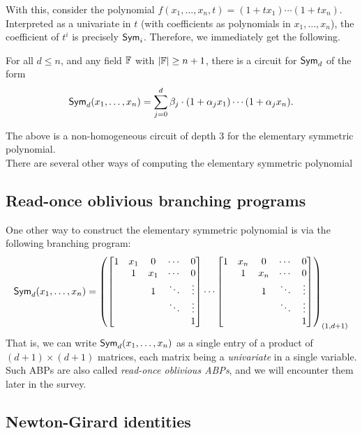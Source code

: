 With this, consider the polynomial $f(x_1,\ldots, x_n, t) = (1 + tx_1) \cdots (1 + tx_n)$. Interpreted as a univariate in $t$ (with coefficients as polynomials in $x_1,\ldots, x_n$), the coefficient of $t^i$ is precisely $\operatorname{\mathsf{Sym}}_i$. Therefore, we immediately get the following. 

\begin{lemma}\label{lem:esym-benor-trick}
  For all $d \leq n$, and any field $\mathbb{F}$ with $|\mathbb{F}| \geq n+1$, there is a circuit for $\operatorname{\mathsf{Sym}}_d$ of the form
  \[
  \operatorname{\mathsf{Sym}}_d(x_1,\ldots, x_n) = \sum_{j=0}^d  \beta_{j} \cdot (1 + \alpha_j x_1) \cdots (1 + \alpha_j x_n).
  \]
\end{lemma}
The above is a non-homogeneous circuit of depth $3$ for the elementary symmetric polynomial. \\

There are several other ways of computing the elementary symmetric polynomial 

\subsection{Read-once oblivious branching programs}

One other way to construct the elementary symmetric polynomial is via the following branching program:
\[
\operatorname{\mathsf{Sym}}_d(x_1,\ldots, x_n) = \left(\begin{bmatrix} 
  1 & x_1 & 0   & \cdots & 0\\
    & 1   & x_1 & \cdots & 0\\
    &    &  1 & \ddots & \vdots\\
    & &  & \ddots & \vdots\\
  & &  &  & 1
\end{bmatrix}
 \cdots \begin{bmatrix} 
  1 & x_n & 0   & \cdots & 0\\
    & 1   & x_n & \cdots & 0\\
    &    &  1 & \ddots & \vdots\\
    & &  & \ddots & \vdots\\
  & &  &  & 1
\end{bmatrix}\right)_{(1,d+1)}
\]
That is, we can write $\operatorname{\mathsf{Sym}}_d(x_1,\dots, x_n)$ as a single entry of a product of $(d+1)\times(d+1)$ matrices, each matrix being a \emph{univariate} in a single variable. Such ABPs are also called \emph{read-once oblivious ABPs}, and we will encounter them later in the survey.

\subsection{Newton-Girard identities}

